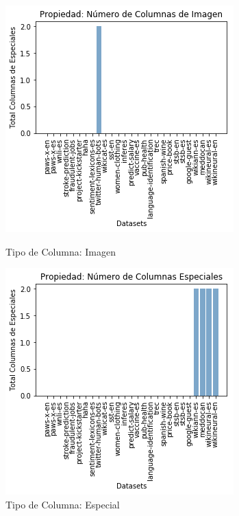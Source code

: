 \begin{figure}
  \centering
    \begin{minipage}[b]{0.31\textwidth}
        \centering
        \includegraphics[width=\textwidth]{Graphics/results/columns_i.png}
          \caption{Tipo de Columna: Imagen}
          \label{fig:columns-i}
    \end{minipage}      
\hspace{0.03cm}
    \begin{minipage}[b]{0.31\textwidth}
        \centering
        \includegraphics[width=\textwidth]{Graphics/results/columns_e.png}
          \caption{Tipo de Columna: Especial}
          \label{fig:columns-e}
        \end{minipage} 
\end{figure}

